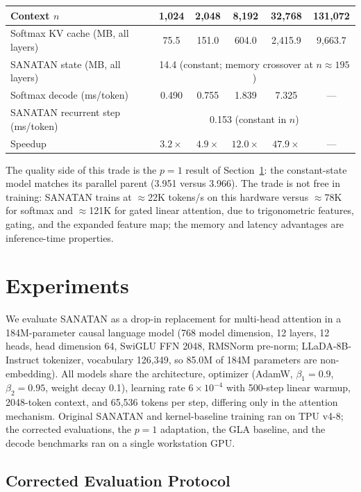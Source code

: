 \documentclass{article}
\begin{document}
\begin{center}
\small
\begin{tabular}{lccccc}
\toprule
Context $n$ & 1{,}024 & 2{,}048 & 8{,}192 & 32{,}768 & 131{,}072 \\
\midrule
Softmax KV cache (MB, all layers) & 75.5 & 151.0 & 604.0 & 2{,}415.9 & 9{,}663.7 \\
SANATAN state (MB, all layers) & \multicolumn{5}{c}{14.4 (constant; memory crossover at $n \approx 195$)} \\
\midrule
Softmax decode (ms/token) & 0.490 & 0.755 & 1.839 & 7.325 & --- \\
SANATAN recurrent step (ms/token) & \multicolumn{5}{c}{0.153 (constant in $n$)} \\
Speedup & $3.2\times$ & $4.9\times$ & $12.0\times$ & $47.9\times$ & --- \\
\bottomrule
\end{tabular}
\end{center}

The quality side of this trade is the $p=1$ result of Section~\ref{sec:experiments}: the constant-state model matches its parallel parent (3.951 versus 3.966). The trade is not free in training: SANATAN trains at $\approx$22K tokens/s on this hardware versus $\approx$78K for softmax and $\approx$121K for gated linear attention, due to trigonometric features, gating, and the expanded feature map; the memory and latency advantages are inference-time properties.

\section{Experiments}
\label{sec:experiments}

We evaluate SANATAN as a drop-in replacement for multi-head attention in a 184M-parameter causal language model (768 model dimension, 12 layers, 12 heads, head dimension 64, SwiGLU FFN 2048, RMSNorm pre-norm; LLaDA-8B-Instruct tokenizer, vocabulary 126{,}349, so 85.0M of 184M parameters are non-embedding). All models share the architecture, optimizer (AdamW, $\beta_1{=}0.9$, $\beta_2{=}0.95$, weight decay 0.1), learning rate $6\times10^{-4}$ with 500-step linear warmup, 2048-token context, and 65{,}536 tokens per step, differing only in the attention mechanism. Original SANATAN and kernel-baseline training ran on TPU v4-8; the corrected evaluations, the $p=1$ adaptation, the GLA baseline, and the decode benchmarks ran on a single workstation GPU.

\subsection{Corrected Evaluation Protocol}
\label{sec:protocol}
\end{document}
